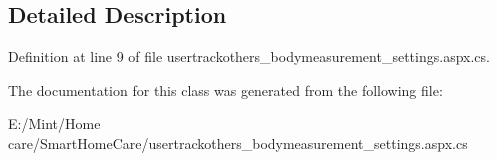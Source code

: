 \subsection{Detailed Description}


Definition at line 9 of file usertrackothers\-\_\-bodymeasurement\-\_\-settings.\-aspx.\-cs.



The documentation for this class was generated from the following file\-:\begin{DoxyCompactItemize}
\item 
E\-:/\-Mint/\-Home care/\-Smart\-Home\-Care/usertrackothers\-\_\-bodymeasurement\-\_\-settings.\-aspx.\-cs\end{DoxyCompactItemize}
